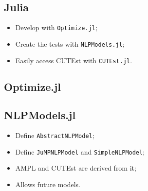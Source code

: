 \subsection{Julia}


\begin{frame}[fragile]
  \begin{itemize}
    \item Develop with \texttt{Optimize.jl};
    \item Create the tests with \texttt{NLPModels.jl};
    \item Easily access CUTEst with \texttt{CUTEst.jl}.
  \end{itemize}
\end{frame}

\subsection{Optimize.jl}


\subsection{NLPModels.jl}

\begin{frame}[fragile]
  \begin{itemize}
    \item Define \texttt{AbstractNLPModel};
    \item Define \texttt{JuMPNLPModel} and
      \texttt{SimpleNLPModel};
    \item AMPL and CUTEst are derived from it;
    \item Allows future models.
  \end{itemize}
\end{frame}

